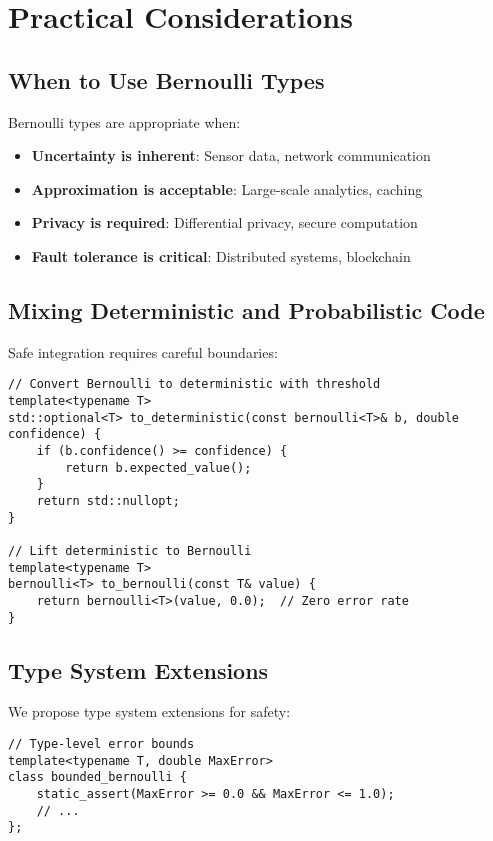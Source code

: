 \documentclass[11pt,final,hidelinks]{article}
\begin{document}
{\section{Practical Considerations}

\subsection{When to Use Bernoulli Types}

Bernoulli types are appropriate when:
\begin{itemize}
    \item \textbf{Uncertainty is inherent}: Sensor data, network communication
    \item \textbf{Approximation is acceptable}: Large-scale analytics, caching
    \item \textbf{Privacy is required}: Differential privacy, secure computation
    \item \textbf{Fault tolerance is critical}: Distributed systems, blockchain
\end{itemize}

\subsection{Mixing Deterministic and Probabilistic Code}

Safe integration requires careful boundaries:

\begin{verbatim}
// Convert Bernoulli to deterministic with threshold
template<typename T>
std::optional<T> to_deterministic(const bernoulli<T>& b, double confidence) {
    if (b.confidence() >= confidence) {
        return b.expected_value();
    }
    return std::nullopt;
}

// Lift deterministic to Bernoulli
template<typename T>
bernoulli<T> to_bernoulli(const T& value) {
    return bernoulli<T>(value, 0.0);  // Zero error rate
}
\end{verbatim}

\subsection{Type System Extensions}

We propose type system extensions for safety:

\begin{verbatim}
// Type-level error bounds
template<typename T, double MaxError>
class bounded_bernoulli {
    static_assert(MaxError >= 0.0 && MaxError <= 1.0);
    // ...
};


\end{verbatim}}
\end{document}
